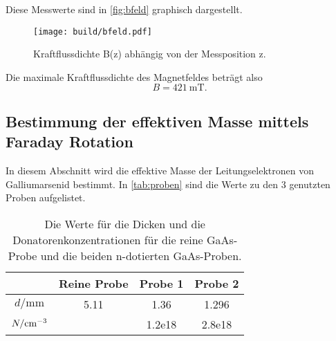 Diese Messwerte sind in \autoref{fig:bfeld} graphisch dargestellt.

\begin{figure}[H]
    \centering
    \texttt{[image: build/bfeld.pdf]}
    \caption{Kraftflussdichte B(z) abhängig von der Messposition z.}
    \label{fig:bfeld}
\end{figure}

Die maximale Kraftflussdichte des Magnetfeldes beträgt also
\begin{equation*}
    B = \SI{421}{\milli\tesla}.
\end{equation*}

\subsection{Bestimmung der effektiven Masse mittels Faraday Rotation}
In diesem Abschnitt wird die effektive Masse der Leitungselektronen von Galliumarsenid bestimmt. In \autoref{tab:proben} sind die Werte zu den 3 genutzten Proben aufgelistet.
\begin{table} \caption{Die Werte für die Dicken und die Donatorenkonzentrationen für die reine GaAs-Probe und die beiden n-dotierten GaAs-Proben.}
    \label{tab:proben}
    \centering
    \begin{tabular}{S[] S[] S[] S[]}
        \toprule
        {} & {Reine Probe} & {Probe 1} & {Probe 2} \\
        \midrule
         $d / \si{\milli\meter}$ & 5.11 & 1.36 & 1.296 \\
         $N / \si[per-mode=reciprocal]{\per\cubic\centi\meter}$ &  & 1.2e18 & 2.8e18 \\
        \bottomrule
    \end{tabular}
\end{table}

